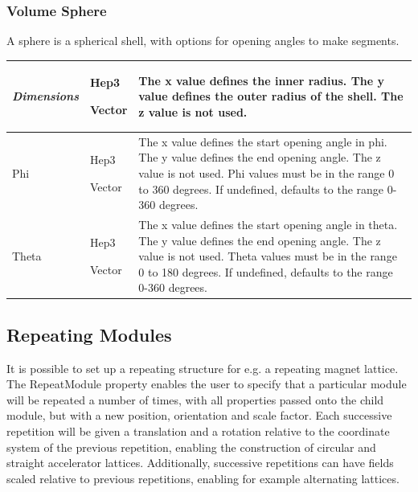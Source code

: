 \subsubsection{Volume Sphere}
A sphere is a spherical shell, with options for opening angles to make segments.

\begin{center}
\tabletail{}
\tablelasttail{}
\begin{supertabular}{|m{3.89cm}|m{1.333cm}|m{11.772cm}|}
\hline
{\itshape Dimensions} &
Hep3

Vector &
The x value defines the inner radius. The y value defines the outer radius of the shell. The z value is not
used.\\\hline
Phi &
Hep3

Vector &
The x value defines the start opening angle in phi. The y value defines the end opening angle. The z value is not used.
Phi values must be in the range 0 to 360 degrees. If undefined, defaults to the range 0-360 degrees.\\\hline
Theta &
Hep3

Vector &
The x value defines the start opening angle in theta. The y value defines the end opening angle. The z value is not
used. Theta values must be in the range 0 to 180 degrees. If undefined, defaults to the range 0-360 degrees.\\\hline
\end{supertabular}
\end{center}

\subsection{Repeating Modules}
It is possible to set up a repeating structure for e.g. a repeating magnet lattice. The RepeatModule property enables
the user to specify that a particular module will be repeated a number of times, with all properties passed onto the
child module, but with a new position, orientation and scale factor. Each successive repetition will be given a
translation and a rotation relative to the coordinate system of the previous repetition, enabling the construction of
circular and straight accelerator lattices. Additionally, successive repetitions can have fields scaled relative to
previous repetitions, enabling for example alternating lattices.

